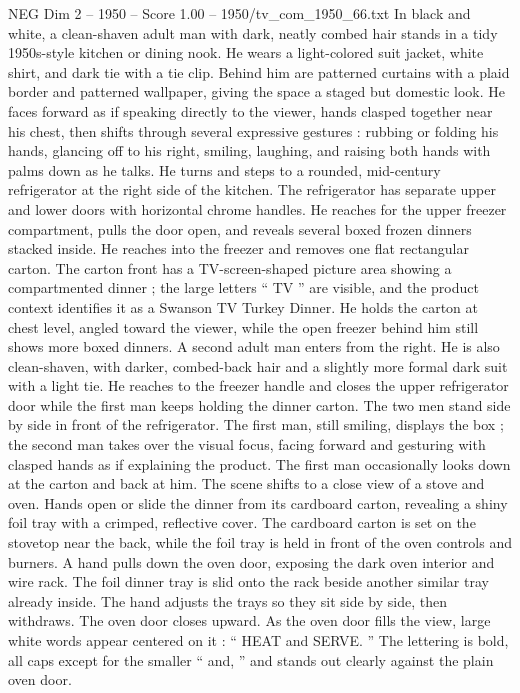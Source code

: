 \begin{textsample}{NEG Dim 2 – 1950 – Score 1.00 – 1950/tv\_com\_1950\_66.txt}  \label{ex:f2_neg_013}
In black and white, a clean-shaven adult man with dark, neatly combed hair stands in a tidy 1950s-style kitchen or dining nook.
He wears a light-colored suit jacket, white shirt, and dark tie with a tie clip.
Behind him are patterned curtains with a plaid border and patterned wallpaper, giving the space a staged but domestic look.
He faces forward as if speaking directly to the viewer, hands clasped together near his chest, then shifts through several expressive gestures : rubbing or folding his hands, glancing off to his right, smiling, laughing, and raising both hands with palms down as he talks.
He turns and steps to a rounded, mid-century refrigerator at the right side of the kitchen.
The refrigerator has separate upper and lower doors with horizontal chrome handles.
He reaches for the upper freezer compartment, pulls the door open, and reveals several boxed frozen dinners stacked inside.
He reaches into the freezer and removes one flat rectangular carton.
The carton front has a TV-screen-shaped picture area showing a compartmented dinner ; the large letters “ TV ” are visible, and the product context identifies it as a Swanson TV Turkey Dinner.
He holds the carton at chest level, angled toward the viewer, while the open freezer behind him still shows more boxed dinners.
A second adult man enters from the right.
He is also clean-shaven, with darker, combed-back hair and a slightly more formal dark suit with a light tie.
He reaches to the freezer handle and closes the upper refrigerator door while the first man keeps holding the dinner carton.
The two men stand side by side in front of the refrigerator.
The first man, still smiling, displays the box ; the second man takes over the visual focus, facing forward and gesturing with clasped hands as if explaining the product.
The first man occasionally looks down at the carton and back at him.
The scene shifts to a close view of a stove and oven.
Hands open or slide the dinner from its cardboard carton, revealing a shiny foil tray with a crimped, reflective cover.
The cardboard carton is set on the stovetop near the back, while the foil tray is held in front of the oven controls and burners.
A hand pulls down the oven door, exposing the dark oven interior and wire rack.
The foil dinner tray is slid onto the rack beside another similar tray already inside.
The hand adjusts the trays so they sit side by side, then withdraws.
The oven door closes upward.
As the oven door fills the view, large white words appear centered on it : “ HEAT and SERVE. ” The lettering is bold, all caps except for the smaller “ and, ” and stands out clearly against the plain oven door.

\end{textsample}
